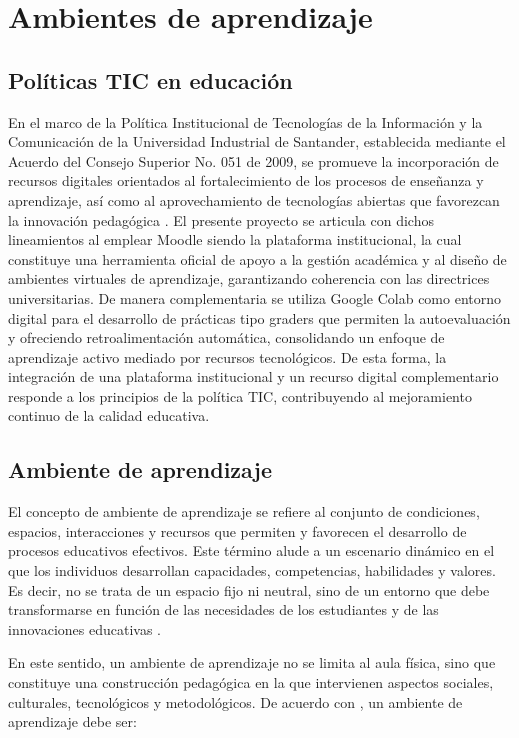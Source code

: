 \documentclass[letter,oneside,12pt,spanish]{report}
\begin{document}
\section{Ambientes de aprendizaje}

\subsection{Políticas TIC en educación}

En el marco de la Política Institucional de Tecnologías de la Información y la Comunicación de la Universidad Industrial de Santander, establecida mediante el Acuerdo del Consejo Superior No. 051 de 2009, se promueve la incorporación de recursos digitales orientados al fortalecimiento de los procesos de enseñanza y aprendizaje, así como al aprovechamiento de tecnologías abiertas que favorezcan la innovación pedagógica \parencite{uis2009}. El presente proyecto se articula con dichos lineamientos al emplear Moodle siendo la plataforma institucional, la cual constituye una herramienta oficial de apoyo a la gestión académica y al diseño de ambientes virtuales de aprendizaje, garantizando coherencia con las directrices universitarias. De manera complementaria se utiliza Google Colab como entorno digital para el desarrollo de prácticas tipo graders que permiten la autoevaluación y ofreciendo retroalimentación automática, consolidando un enfoque de aprendizaje activo mediado por recursos tecnológicos. De esta forma, la integración de una plataforma institucional y un recurso digital complementario responde a los principios de la política TIC, contribuyendo al mejoramiento continuo de la calidad educativa.

\subsection{Ambiente de aprendizaje}

El concepto de ambiente de aprendizaje se refiere al conjunto de condiciones, espacios, interacciones y recursos que permiten y favorecen el desarrollo de procesos educativos efectivos. Este término alude a un escenario dinámico en el que los individuos desarrollan capacidades, competencias, habilidades y valores. Es decir, no se trata de un espacio fijo ni neutral, sino de un entorno que debe transformarse en función de las necesidades de los estudiantes y de las innovaciones educativas \parencite{castro2019}.

En este sentido, un ambiente de aprendizaje no se limita al aula física, sino que constituye una construcción pedagógica en la que intervienen aspectos sociales, culturales, tecnológicos y metodológicos. De acuerdo con \textcite{castro2019}, un ambiente de aprendizaje debe ser:
\end{document}
